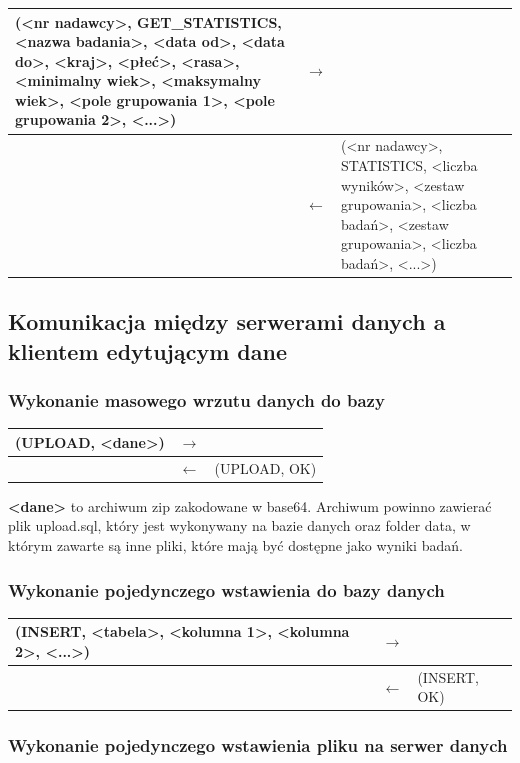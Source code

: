 \begin{longtable}{| p{} | p{}| p{} |} 
\hline
(<nr nadawcy>, GET\_STATISTICS, <nazwa badania>, <data od>, <data do>, <kraj>, <płeć>, <rasa>, <minimalny wiek>, <maksymalny wiek>, {<pole grupowania 1>, <pole grupowania 2>, <...>}) & $\rightarrow$ &  \\ \hline
 & $\leftarrow$ & (<nr nadawcy>, STATISTICS, <liczba wyników>, <zestaw grupowania>, <liczba badań>, <zestaw grupowania>, <liczba badań>, <...>) \\ \hline
\end{longtable}

\subsection{Komunikacja między serwerami danych a klientem edytującym dane}
\subsubsection{Wykonanie masowego wrzutu danych do bazy}

\begin{longtable}{| p{} | p{}| p{} |} 
\hline
(UPLOAD, <dane>) & $\rightarrow$ &  \\ \hline
 & $\leftarrow$ & (UPLOAD, OK) \\ \hline
\end{longtable}

\textbf{<dane>} to archiwum zip zakodowane w base64. Archiwum powinno zawierać plik upload.sql, który jest wykonywany na bazie danych oraz folder data, w którym zawarte są inne pliki, które mają być dostępne jako wyniki badań.

\subsubsection{Wykonanie pojedynczego wstawienia do bazy danych}

\begin{longtable}{| p{} | p{}| p{} |} 
\hline
(INSERT, <tabela>, <kolumna 1>, <kolumna 2>, <...>) & $\rightarrow$ &  \\ \hline
 & $\leftarrow$ & (INSERT, OK) \\ \hline
\end{longtable}

\subsubsection{Wykonanie pojedynczego wstawienia pliku na serwer danych}

